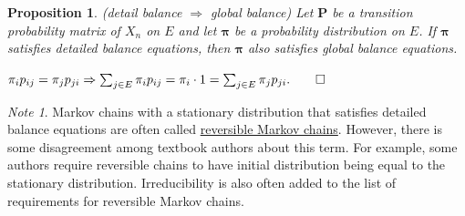 \documentclass[11pt]{article}\usepackage[]{graphicx}\usepackage[]{color}
\numberwithin{algorithm}{section}
\newtheorem*{prop}{Proposition}
\theoremstyle{remark}
\newtheorem*{mynote}{Note}
\theoremstyle{definition}
\newenvironment{Proof}{\begin{trivlist}
\item[\hskip \labelsep \textit{Proof}:]}{\end{trivlist}}
\begin{document}
\begin{prop}(detail balance $\Rightarrow$ global balance)
  Let $\mathbf{P}$ be a transition probability matrix of $X_n$ on $E$ and let $\boldsymbol{\pi}$ be a
probability distribution on $E$. If $\boldsymbol{\pi}$ satisfies detailed balance equations, then 
$\boldsymbol{\pi}$ also satisfies global balance equations.
\end{prop}

\begin{Proof}
  $\pi_i p_{ij} = \pi_j p_{ji}
  \Rightarrow \sum_{j \in E} \pi_ip_{ij} 
  = \pi_i\cdot 1 
  = \sum_{j\in E} \pi_j p_{ji}. \qed$
\end{Proof}
\begin{mynote}
  Markov chains with a stationary distribution that satisfies detailed balance equations are often 
  called \underline{reversible Markov chains}. However, there is some disagreement among textbook
  authors about this term. For example, some authors require reversible chains to have initial
  distribution being equal to the stationary distribution. Irreducibility is also often added to 
  the list of requirements for reversible Markov chains.
\end{mynote}
\end{document}
